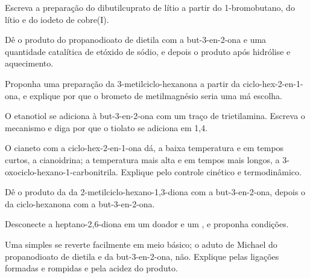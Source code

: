 \begin{exercise}[$\star$]\label{exo:b2:conjugate-additions:3}
Escreva a preparação do dibutilcuprato de lítio a partir do 1-bromobutano, do lítio e do iodeto de cobre(I).
\end{exercise}

\begin{exercise}[$\star$]\label{exo:b2:conjugate-additions:4}
Dê o produto do propanodioato de dietila com a but-3-en-2-ona e uma quantidade catalítica de etóxido
de sódio, e depois o produto após hidrólise e aquecimento.
\end{exercise}

\begin{exercise}[$\star\star$]\label{exo:b2:conjugate-additions:5}
Proponha uma preparação da 3-metilciclo-hexanona a partir da ciclo-hex-2-en-1-ona, e explique por que
o brometo de metilmagnésio seria uma má escolha.
\end{exercise}

\begin{exercise}[$\star\star$]\label{exo:b2:conjugate-additions:6}
O etanotiol se adiciona à but-3-en-2-ona com um traço de trietilamina. Escreva o mecanismo e diga por
que o tiolato se adiciona em 1,4.
\end{exercise}

\begin{exercise}[$\star\star$]\label{exo:b2:conjugate-additions:7}
O cianeto com a ciclo-hex-2-en-1-ona dá, a baixa temperatura e em tempos curtos, a cianoidrina; a
temperatura mais alta e em tempos mais longos, a 3-oxociclo-hexano-1-carbonitrila. Explique pelo
controle cinético e termodinâmico.
\end{exercise}

\begin{exercise}[$\star\star$]\label{exo:b2:conjugate-additions:8}
Dê o produto da  da 2-metilciclo-hexano-1,3-diona com a but-3-en-2-ona, depois o da
ciclo-hexanona com a but-3-en-2-ona.
\end{exercise}

\begin{exercise}[$\star\star$]\label{exo:b2:conjugate-additions:9}
Desconecte a heptano-2,6-diona em um doador e um , e proponha condições.
\end{exercise}

\begin{exercise}[$\star\star\star$]\label{exo:b2:conjugate-additions:10}
Uma  simples se reverte facilmente em meio básico; o aduto de Michael do propanodioato de
dietila e da but-3-en-2-ona, não. Explique pelas ligações formadas e rompidas e pela acidez do produto.
\end{exercise}

